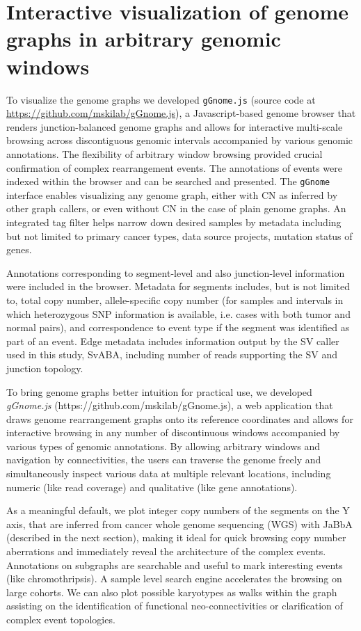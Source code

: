 \documentclass[phd,tocprelim]{cornell}
\begin{document}
\section{Interactive visualization of genome graphs in arbitrary genomic windows}
To visualize the genome graphs we developed \texttt{gGnome.js} (source code at \url{https://github.com/mskilab/gGnome.js}), a Javascript-based genome browser that renders junction-balanced genome graphs and allows for interactive multi-scale browsing across discontiguous genomic intervals accompanied by various genomic annotations. The flexibility of arbitrary window browsing provided crucial confirmation of complex rearrangement events. The annotations of events were indexed within the browser and can be searched and presented. The \texttt{gGnome} interface enables visualizing any genome graph, either with CN as inferred by other graph callers, or even without CN in the case of plain genome graphs. An integrated tag filter helps narrow down desired samples by metadata including but not limited to primary cancer types, data source projects, mutation status of genes.

Annotations corresponding to segment-level and also junction-level information were included in the browser. Metadata for segments includes, but is not limited to, total copy number, allele-specific copy number (for samples and intervals in which heterozygous SNP information is available, i.e. cases with both tumor and normal pairs), and correspondence to event type if the segment was identified as part of an event. Edge metadata includes information output by the SV caller used in this study, SvABA, including number of reads supporting the SV and junction topology.

To bring genome graphs better intuition for practical use, we developed \textit{gGnome.js} (https://github.com/mskilab/gGnome.js), a web application that draws genome rearrangement graphs onto its reference coordinates and allows for interactive browsing in any number of discontinuous windows accompanied by various types of genomic annotations. By allowing arbitrary windows and navigation by connectivities, the users can traverse the genome freely and simultaneously inspect various data at multiple relevant locations, including numeric (like read coverage) and qualitative (like gene annotations).


As a meaningful default, we plot integer copy numbers of the segments on the Y axis, that are inferred from cancer whole genome sequencing (WGS) with JaBbA (described in the next section), making it ideal for quick browsing copy number aberrations and immediately reveal the architecture of the complex events. Annotations on subgraphs are searchable and useful to mark interesting events (like chromothripsis). A sample level search engine accelerates the browsing on large cohorts. We can also plot possible karyotypes as walks within the graph assisting on the identification of functional neo-connectivities or clarification of complex event topologies.
\end{document}
